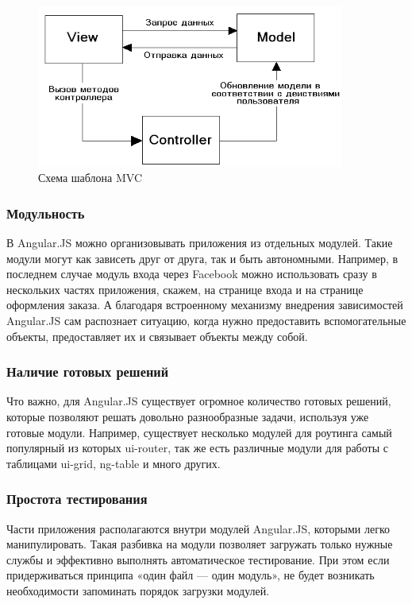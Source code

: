 \begin{figure}
  \centering
  \includegraphics[width=0.9\textwidth]{images/mvc.png}
  \caption{Схема шаблона MVC\label{mvc}}
\end{figure}

\subsubsection*{Модульность}
В Angular.JS можно организовывать приложения из отдельных модулей. Такие модули
могут как зависеть друг от друга, так и быть автономными. Например, в последнем
случае модуль входа через Facebook можно использовать сразу в нескольких частях приложения,
скажем, на странице входа и на странице оформления заказа. А благодаря встроенному механизму
внедрения зависимостей Angular.JS сам распознает ситуацию, когда нужно предоставить
вспомогательные объекты, предоставляет их и связывает объекты между собой.
\subsubsection*{Наличие готовых решений}
Что важно, для Angular.JS существует огромное количество готовых решений, которые
позволяют решать довольно разнообразные задачи, используя уже готовые модули.
Например, существует несколько модулей для роутинга самый популярный из которых
ui-router, так же есть различные модули для работы с таблицами ui-grid, ng-table
и много других.
\subsubsection*{Простота тестирования}
Части приложения располагаются внутри модулей Angular.JS, которыми легко манипулировать.
Такая разбивка на модули позволяет загружать только нужные службы и эффективно выполнять
автоматическое тестирование. При этом если придерживаться принципа «один файл — один модуль»,
не будет возникать необходимости запоминать порядок загрузки модулей.

